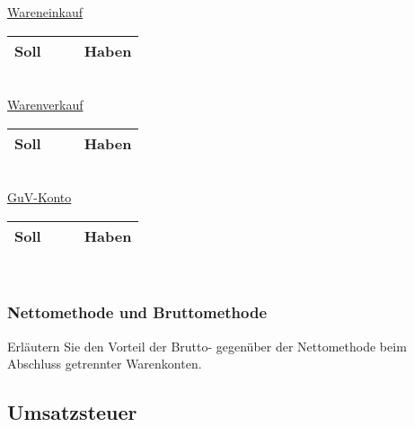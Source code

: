 \documentclass[paper=a4, fontsize=11pt]{scrartcl}
\numberwithin{equation}{section}
\numberwithin{figure}{section}
\numberwithin{table}{section}
\begin{document}
\underline{Wareneinkauf}

\begin{tabular}{cc|cc}
\hline
Soll & & & Haben \\
\hline
\end{tabular}
\\

\underline{Warenverkauf}

\begin{tabular}{cc|cc}
\hline
Soll & & & Haben \\
\hline
\end{tabular}
\\

\underline{GuV-Konto}

\begin{tabular}{cc|cc}
\hline
Soll & & & Haben \\
\hline
\end{tabular}
\\


\subsubsection{Nettomethode und Bruttomethode}

Erläutern Sie den Vorteil der Brutto- gegenüber der Nettomethode beim Abschluss getrennter Warenkonten. 


\subsection{Umsatzsteuer}

\end{document}
